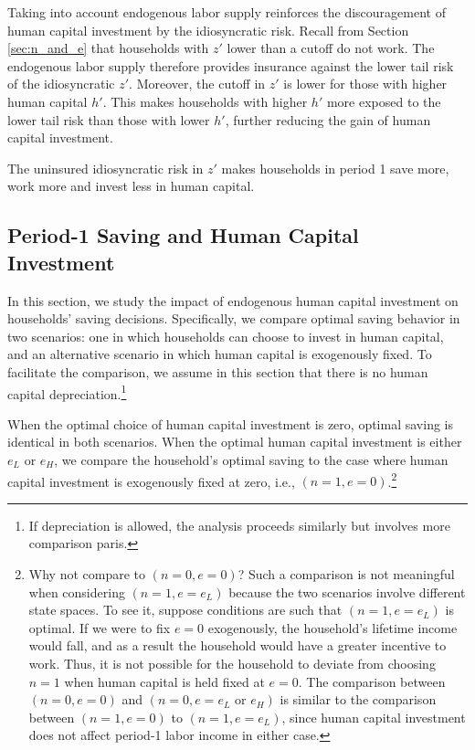 \documentclass[12pt,english]{article}
\numberwithin{equation}{section}
\begin{document}
Taking into account endogenous labor supply reinforces the discouragement of human capital investment by the idiosyncratic risk. Recall from Section \ref{sec:n_and_e} that households with $z'$ lower than a cutoff do not work. The endogenous labor supply therefore provides insurance against the lower tail risk of the idiosyncratic $z'$. Moreover, the cutoff in $z'$ is lower for those with higher human capital $h'$. This makes households with higher $h'$ more exposed to the lower tail risk than those with lower $h'$, further reducing the gain of human capital investment.


\begin{proposition}
    The uninsured idiosyncratic risk in $z'$ makes households in period 1 save more, work more and invest less in human capital.
\end{proposition}


\subsection{Period-1 Saving and Human Capital Investment}\label{sec:saving}
In this section, we study the impact of endogenous human capital investment on households’ saving decisions. Specifically, we compare optimal saving behavior in two scenarios: one in which households can choose to invest in human capital, and an alternative scenario in which human capital is exogenously fixed. To facilitate the comparison, we assume in this section that there is no human capital depreciation.\footnote{If depreciation is allowed, the analysis proceeds similarly but involves more comparison paris.}

When the optimal choice of human capital investment is zero, optimal saving is identical in both scenarios. When the optimal human capital investment is either $e_L$ or $e_H$, we compare the household's optimal saving to the case where human capital investment is exogenously fixed at zero, i.e., $(n=1, e=0)$.\footnote{Why not compare to $(n=0,e=0)$? Such a comparison is not meaningful when considering $(n=1, e=e_L)$ because the two scenarios involve different state spaces. To see it, suppose conditions are 
such that $(n=1,e=e_L)$ is optimal. If we were to fix $e=0$ 
exogenously, the household’s lifetime income would fall, 
and as a result the household would have a greater 
incentive to work. Thus, it is not possible for the 
household to deviate from choosing $n=1$ when human capital 
is held fixed at $e=0$. The comparison between $(n=0,e=0)$ 
and $(n=0,e=e_L \text{ or } e_H)$ is similar to the 
comparison between $(n=1,e=0)$ to $(n=1,e=e_L)$, since human capital investment does not affect period-1 labor income in either case.}
\end{document}
